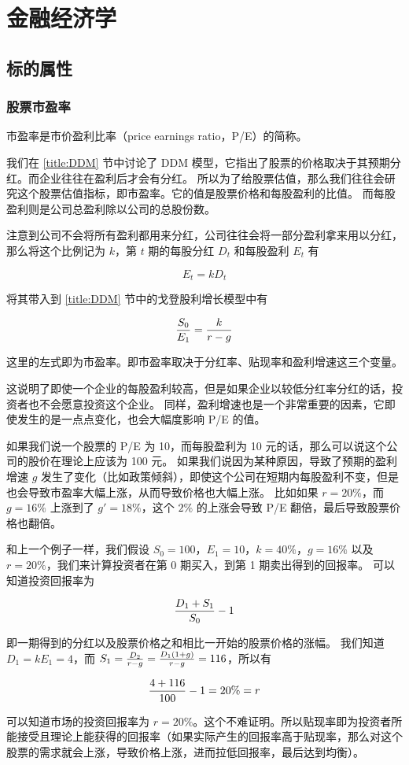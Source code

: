 \documentclass[utf8,a4paper,nofonts,9pt]{ctexbook}
\begin{document}
\chapter{金融经济学}

\section{标的属性}

\subsection{股票市盈率}

市盈率是市价盈利比率（price earnings ratio，P/E）的简称。

我们在 \ref{title:DDM} 节中讨论了 DDM 模型，它指出了股票的价格取决于其预期分红。而企业往往在盈利后才会有分红。
所以为了给股票估值，那么我们往往会研究这个股票估值指标，即市盈率。它的值是股票价格和每股盈利的比值。
而每股盈利则是公司总盈利除以公司的总股份数。

注意到公司不会将所有盈利都用来分红，公司往往会将一部分盈利拿来用以分红，那么将这个比例记为 $k$，第 $t$ 期的每股分红 $D_t$ 和每股盈利 $E_t$ 有

$$
E_t = kD_t
$$

将其带入到 \ref{title:DDM} 节中的戈登股利增长模型中有

$$
{S_0 \over E_1} = {k \over r - g}
$$

这里的左式即为市盈率。即市盈率取决于分红率、贴现率和盈利增速这三个变量。

这说明了即使一个企业的每股盈利较高，但是如果企业以较低分红率分红的话，投资者也不会愿意投资这个企业。
同样，盈利增速也是一个非常重要的因素，它即使发生的是一点点变化，也会大幅度影响 P/E 的值。

\begin{exampleBox}
如果我们说一个股票的 P/E 为 10，而每股盈利为 10 元的话，那么可以说这个公司的股价在理论上应该为 100 元。
如果我们说因为某种原因，导致了预期的盈利增速 $g$ 发生了变化（比如政策倾斜），即使这个公司在短期内每股盈利不变，但是也会导致市盈率大幅上涨，从而导致价格也大幅上涨。
比如如果 $r = 20\%$，而 $g = 16\%$ 上涨到了 $g' = 18\%$，这个 $2\%$ 的上涨会导致 P/E 翻倍，最后导致股票价格也翻倍。
\end{exampleBox}

\begin{exampleBox}
和上一个例子一样，我们假设 $S_0 = 100$，$E_1 = 10$，$k = 40\%$，$g = 16\%$ 以及 $r = 20\%$，我们来计算投资者在第 0 期买入，到第 1 期卖出得到的回报率。
可以知道投资回报率为

$$
{D_1 + S_1 \over S_0} - 1
$$

即一期得到的分红以及股票价格之和相比一开始的股票价格的涨幅。
我们知道 $D_1 = k E_1 = 4$，而 $S_1 = {D_2 \over r - g} = {D_1 (1 + g) \over r - g} = 116$，所以有

$$
{4 + 116 \over 100} - 1 = 20\% = r
$$

可以知道市场的投资回报率为 $r = 20\%$。这个不难证明。所以贴现率即为投资者所能接受且理论上能获得的回报率（如果实际产生的回报率高于贴现率，那么对这个股票的需求就会上涨，导致价格上涨，进而拉低回报率，最后达到均衡）。
\end{exampleBox}
\end{document}
